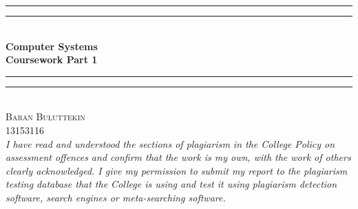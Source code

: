 \documentclass[12pt]{article}
\begin{document}
    \begin{titlepage}
        \begin{center}
            \vspace*{.06\textheight}{\scshape\LARGE Birkbeck, University of London\par}\vspace{1.5cm} %
            \rule[0.5ex]{\linewidth}{2pt}\vspace*{-\baselineskip}\vspace*{3.2pt}
            \rule[0.5ex]{\linewidth}{1pt}\\[\baselineskip]
            \huge{\bfseries Computer Systems\\Coursework Part 1}\\[4mm]
            \rule[0.5ex]{\linewidth}{1pt}\vspace*{-\baselineskip}\vspace{3.2pt}
            \rule[0.5ex]{\linewidth}{2pt}\\
            [2.5cm]
        
            \textsc{\Large Baran Buluttekin\\13153116}\\
            [1.5cm]
            \large \textit{ I have read and understood the sections of plagiarism in the College Policy on assessment offences and confirm that the work is my own, with the work of others clearly acknowledged. I give my permission to submit my report to the plagiarism testing database that the College is using and test it using plagiarism detection software, search engines or meta-searching software.}


        \end{center}
    \end{titlepage}
\end{document}
